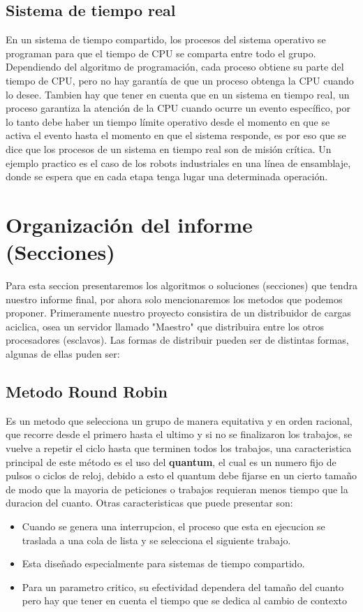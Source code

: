 \documentclass[conference,letterpaper]{IEEEtran}
\begin{document}
\subsection{Sistema de tiempo real}
 En un sistema de tiempo compartido, los procesos del sistema operativo se programan para que el tiempo de CPU se comparta entre todo el grupo. Dependiendo del algoritmo de programación, cada proceso obtiene su parte del tiempo de CPU, pero no hay garantía de que un proceso obtenga la CPU cuando lo desee. Tambien hay que tener en cuenta que en un sistema en tiempo real, un proceso garantiza la atención de la CPU cuando ocurre un evento específico, por lo tanto debe haber un tiempo límite operativo desde el momento en que se activa el evento hasta el momento en que el sistema responde, es por eso que se dice que los procesos de un sistema en tiempo real son de misión crítica. Un ejemplo practico es el caso de los robots industriales en una línea de ensamblaje, donde se espera que en cada etapa tenga lugar una determinada operación.\\
 
\section{Organizaci\'on del informe (Secciones)}
Para esta seccion presentaremos los algoritmos o soluciones (secciones) que tendra nuestro informe final, por ahora solo mencionaremos los metodos que podemos proponer. Primeramente nuestro proyecto consistira de un distribuidor de cargas aciclica, osea un servidor llamado "Maestro" que distribuira entre los otros procesadores (esclavos). Las formas de distribuir pueden ser de distintas formas, algunas de ellas puden ser:

\subsection{Metodo Round Robin}
Es un metodo que selecciona un grupo de manera equitativa y en orden racional, que recorre desde el primero hasta el ultimo y si no se finalizaron los trabajos, se vuelve a repetir el ciclo hasta que terminen todos los trabajos, una caracteristica principal de este m\'etodo es el uso del \textbf{quantum}, el cual es un numero fijo de pulsos o ciclos de reloj, debido a esto el quantum debe fijarse en un cierto tamaño de modo que la mayoria de peticiones o trabajos requieran menos tiempo que la duracion del cuanto. Otras caracteristicas que puede presentar son:

\begin{itemize}
    \item Cuando se genera una interrupcion, el proceso que esta en ejecucion se traslada a una cola de lista y se selecciona el siguiente trabajo.
    \item Esta diseñado especialmente para sistemas de tiempo compartido.
    \item Para un parametro critico, su efectividad dependera del tamaño del cuanto pero hay que tener en cuenta el tiempo que se dedica al cambio de contexto
\end{itemize}
\end{document}
